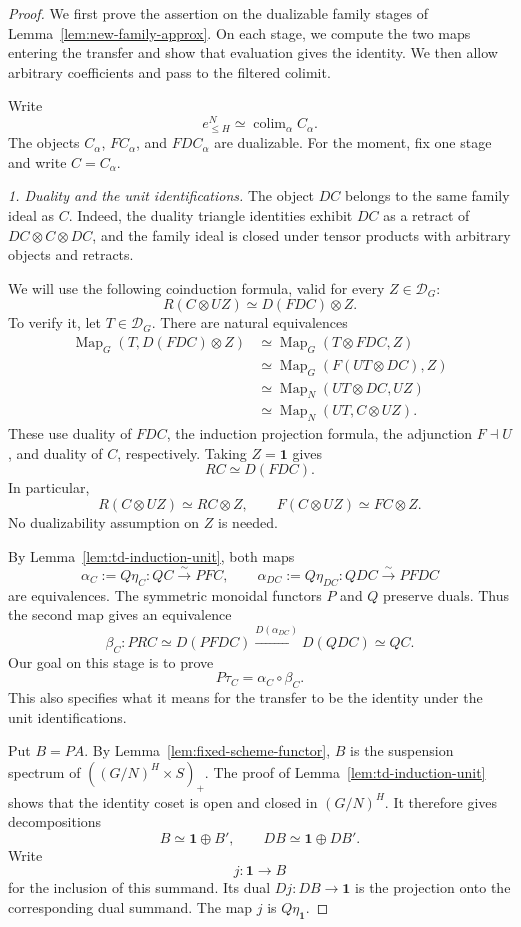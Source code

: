 \documentclass[11pt,reqno]{amsart}
\theoremstyle{definition}
\theoremstyle{remark}
\theoremstyle{plain}
\numberwithin{equation}{section}
\newcommand{\one}{\mathbf 1}
\DeclareMathOperator{\Map}{Map}
\DeclareMathOperator*{\colim}{colim}
\newcommand{\D}{\mathcal D}
\begin{document}
\begin{proof}
We first prove the assertion on the dualizable family stages of
Lemma~\ref{lem:new-family-approx}. On each stage, we compute the
two maps entering the transfer and show that evaluation gives the
identity. We then allow arbitrary coefficients and pass to the
filtered colimit.

Write
\[
 e_{\le H}^N\simeq\colim_\alpha C_\alpha.
\]
The objects \(C_\alpha\), \(FC_\alpha\), and \(FDC_\alpha\)
are dualizable. For the moment, fix one stage and write \(C=C_\alpha\).

\smallskip
\noindent
\emph{1. Duality and the unit identifications.}
The object \(DC\) belongs to the same family ideal as \(C\).
Indeed, the duality triangle identities exhibit \(DC\) as a
retract of \(DC\otimes C\otimes DC\), and the family ideal is
closed under tensor products with arbitrary objects and retracts.

We will use the following coinduction formula, valid for every
\(Z\in\D_G\):
\[
 R(C\otimes UZ)\simeq D(FDC)\otimes Z.
\]
To verify it, let \(T\in\D_G\). There are natural equivalences
\begin{align*}
 \Map_G(T,D(FDC)\otimes Z)
 &\simeq \Map_G(T\otimes FDC,Z)\\
 &\simeq \Map_G(F(UT\otimes DC),Z)\\
 &\simeq \Map_N(UT\otimes DC,UZ)\\
 &\simeq \Map_N(UT,C\otimes UZ).
\end{align*}
These use duality of \(FDC\), the induction projection formula,
the adjunction \(F\dashv U\), and duality of \(C\), respectively.
Taking \(Z=\one\) gives
\[
 RC\simeq D(FDC).
\]
In particular,
\[
 R(C\otimes UZ)\simeq RC\otimes Z,
 \qquad
 F(C\otimes UZ)\simeq FC\otimes Z.
\]
No dualizability assumption on \(Z\) is needed.

By Lemma~\ref{lem:td-induction-unit}, both maps
\[
 \alpha_C:=Q\eta_C:QC\xrightarrow{\sim}PFC,
 \qquad
 \alpha_{DC}:=Q\eta_{DC}:QDC\xrightarrow{\sim}PFDC
\]
are equivalences.
The symmetric monoidal functors \(P\) and \(Q\) preserve duals.
Thus the second map gives an equivalence
\[
 \beta_C:
 PRC\simeq D(PFDC)
 \xrightarrow{D(\alpha_{DC})}D(QDC)
 \simeq QC.
\]
Our goal on this stage is to prove
\[
 P\tau_C=\alpha_C\circ\beta_C.
\]
This also specifies what it means for the transfer to be the
identity under the unit identifications.

Put \(B=PA\). By Lemma~\ref{lem:fixed-scheme-functor},
\(B\) is the suspension spectrum of
\(((G/N)^H\times S)_+\).
The proof of Lemma~\ref{lem:td-induction-unit} shows that the
identity coset is open and closed in \((G/N)^H\).
It therefore gives decompositions
\[
 B\simeq\one\oplus B',
 \qquad
 DB\simeq\one\oplus DB'.
\]
Write
\[
 j:\one\longrightarrow B
\]
for the inclusion of this summand. Its dual
\(Dj:DB\to\one\) is the projection onto the corresponding
dual summand. The map \(j\) is \(Q\eta_{\one}\).


\end{proof}
\end{document}
